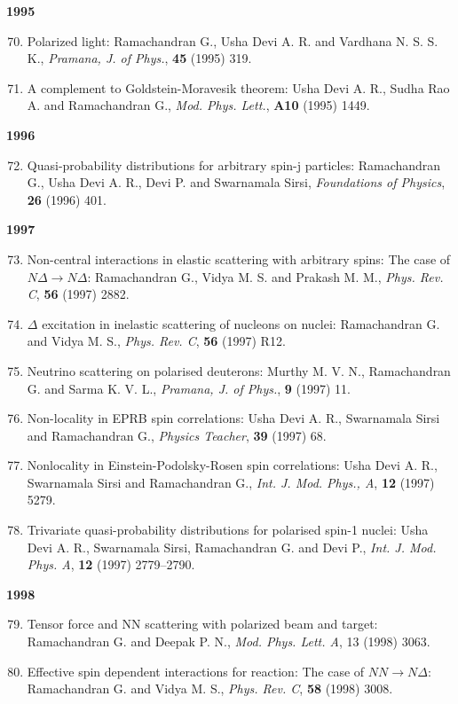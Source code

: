 \textbf{1995}
\begin{enumerate}
\setcounter{enumi}{69}
\item Polarized light: Ramachandran G., Usha Devi A. R. and Vardhana N. S. S. K., \textit{Pramana, J. of Phys.}, {\bf 45} (1995) 319.
\item A complement to Goldstein-Moravesik theorem: Usha Devi A. R., Sudha Rao A. and Ramachandran G., \textit{Mod. Phys. Lett.}, {\bf A10} (1995) 1449.
\end{enumerate}
\textbf{1996}
\begin{enumerate}
\setcounter{enumi}{71}
\item Quasi-probability distributions for arbitrary spin-j particles: Ramachandran G., Usha Devi A. R., Devi P. and Swarnamala Sirsi, \textit{Foundations of Physics}, {\bf 26} (1996) 401.
\end{enumerate}
\textbf{1997}
\begin{enumerate}
\setcounter{enumi}{72}
\item Non-central interactions in elastic scattering with arbitrary spins: The case of $N\Delta\to N\Delta$: Ramachandran G., Vidya M. S. and Prakash M. M., \textit{Phys. Rev. C}, {\bf 56} (1997) 2882.
\item $\Delta$ excitation in inelastic scattering of nucleons on nuclei: Ramachandran G. and Vidya M. S., \textit{Phys. Rev. C}, {\bf 56} (1997) R12.
\item Neutrino scattering on polarised deuterons: Murthy M. V. N., Ramachandran G. and Sarma K. V. L., \textit{Pramana, J. of Phys.}, {\bf 9} (1997) 11.
\item Non-locality in EPRB spin correlations: Usha Devi A. R., Swarnamala Sirsi and Ramachandran G., \textit{Physics Teacher}, {\bf 39} (1997) 68.
\item Nonlocality in Einstein-Podolsky-Rosen spin correlations: Usha Devi A. R., Swarnamala Sirsi and Ramachandran G., \textit{Int. J. Mod. Phys., A}, {\bf 12} (1997) 5279.
\item Trivariate quasi-probability distributions for polarised spin-1 nuclei: Usha Devi A. R., Swarnamala Sirsi, Ramachandran G. and Devi P., \textit{Int. J. Mod. Phys. A}, {\bf 12} (1997) 2779--2790.
\end{enumerate}
\textbf{1998}
\begin{enumerate}
\setcounter{enumi}{78}
\item Tensor force and NN scattering with polarized beam and target: Ramachandran G. and Deepak P. N., \textit{Mod. Phys. Lett. A}, 13 (1998) 3063.
\item Effective spin dependent interactions for reaction: The case of $NN \to N\Delta$: Ramachandran G. and Vidya M. S., \textit{Phys. Rev. C}, {\bf 58} (1998) 3008.
\end{enumerate}
